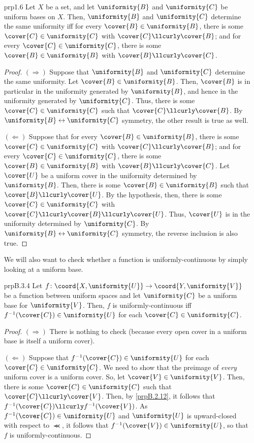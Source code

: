\begin{prp}{}{prp1.6}
Let $X$ be a set, and let $\uniformity{B}$ and $\uniformity{C}$ be uniform bases on $X$.  Then, $\uniformity{B}$ and $\uniformity{C}$ determine the same uniformity iff for every $\cover{B}\in \uniformity{B}$, there is some $\cover{C}\in \uniformity{C}$ with $\cover{C}\llcurly \cover{B}$; and for every $\cover{C}\in \uniformity{C}$, there is some $\cover{B}\in \uniformity{B}$ with $\cover{B}\llcurly \cover{C}$.
\begin{proof}
$(\Rightarrow )$ Suppose that $\uniformity{B}$ and $\uniformity{C}$ determine the same uniformity.  Let $\cover{B}\in \uniformity{B}$.  Then, $\cover{B}$ is in particular in the uniformity generated by $\uniformity{B}$, and hence in the uniformity generated by $\uniformity{C}$.  Thus, there is some $\cover{C}\in \uniformity{C}$ such that $\cover{C}\llcurly \cover{B}$.  By $\uniformity{B}\leftrightarrow \uniformity{C}$ symmetry, the other result is true as well.

\blankline
\noindent
$(\Leftarrow )$ Suppose that for every $\cover{B}\in \uniformity{B}$, there is some $\cover{C}\in \uniformity{C}$ with $\cover{C}\llcurly \cover{B}$; and for every $\cover{C}\in \uniformity{C}$, there is some $\cover{B}\in \uniformity{B}$ with $\cover{B}\llcurly \cover{C}$.  Let $\cover{U}$ be a uniform cover in the uniformity determined by $\uniformity{B}$.  Then, there is some $\cover{B}\in \uniformity{B}$ such that $\cover{B}\llcurly \cover{U}$.  By the hypothesis, then, there is some $\cover{C}\in \uniformity{C}$ with $\cover{C}\llcurly \cover{B}\llcurly \cover{U}$.  Thus, $\cover{U}$ is in the uniformity determined by $\uniformity{C}$.  By $\uniformity{B}\leftrightarrow \uniformity{C}$ symmetry, the reverse inclusion is also true.
\end{proof}
\end{prp}
We will also want to check whether a function is uniformly-continuous by simply looking at a uniform base.
\begin{prp}{}{prpB.3.4}
Let $f\colon \coord{X,\uniformity{U}}\rightarrow \coord{Y,\uniformity{V}}$ be a function between uniform spaces and let $\uniformity{C}$ be a uniform base for $\uniformity{V}$.  Then, $f$ is uniformly-continuous iff $f^{-1}(\cover{C})\in \uniformity{U}$ for each $\cover{C}\in \uniformity{C}$.
\begin{proof}
$(\Rightarrow )$ There is nothing to check (because every open cover in a uniform base is itself a uniform cover).

\blankline
\noindent
$(\Leftarrow )$ Suppose that $f^{-1}(\cover{C})\in \uniformity{U}$ for each $\cover{C}\in \uniformity{C}$.  We need to show that the preimage of \emph{every} uniform cover is a uniform cover.  So, let $\cover{V}\in \uniformity{V}$.  Then, there is some $\cover{C}\in \uniformity{C}$ such that $\cover{C}\llcurly \cover{V}$.  Then, by \cref{prpB.2.12}, it follows that $f^{-1}(\cover{C})\llcurly f^{-1}(\cover{V})$.  As $f^{-1}(\cover{C})\in \uniformity{U}$ and $\uniformity{U}$ is upward-closed with respect to $\llcurly$, it follows that $f^{-1}(\cover{V})\in \uniformity{U}$, so that $f$ is uniformly-continuous.
\end{proof}
\end{prp}

